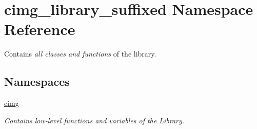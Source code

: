 \hypertarget{namespacecimg__library__suffixed}{}\section{cimg\+\_\+library\+\_\+suffixed Namespace Reference}
\label{namespacecimg__library__suffixed}


Contains {\itshape all classes and functions} of the  library.  


\subsection*{Namespaces}
\begin{DoxyCompactItemize}
\item 
 \hyperlink{namespacecimg__library__suffixed_1_1cimg}{cimg}
\begin{DoxyCompactList}\small\item\em Contains {\itshape low-\/level} functions and variables of the  Library. \end{DoxyCompactList}\end{DoxyCompactItemize}
